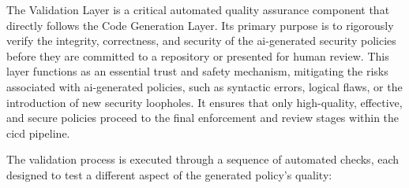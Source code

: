 The Validation Layer is a critical automated quality assurance component that directly follows the Code Generation Layer. Its primary purpose is to rigorously verify the integrity, correctness, and security of the \gls{ai}-generated security policies before they are committed to a repository or presented for human review. This layer functions as an essential trust and safety mechanism, mitigating the risks associated with \gls{ai}-generated policies, such as syntactic errors, logical flaws, or the introduction of new security loopholes. It ensures that only high-quality, effective, and secure policies proceed to the final enforcement and review stages within the \gls{cicd} pipeline.

The validation process is executed through a sequence of automated checks, each designed to test a different aspect of the generated policy's quality:

